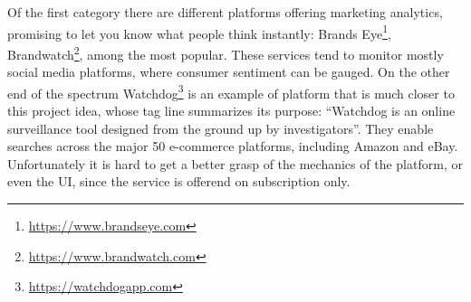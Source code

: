 Of the first category there are different platforms offering marketing
analytics, promising to let you know what people think instantly: Brands
Eye\texttrademark\footnote{\url{https://www.brandseye.com}},
Brandwatch\texttrademark\footnote{\url{https://www.brandwatch.com}}, among the
most popular. These services tend to monitor mostly social media platforms,
where consumer sentiment can be gauged. On the other end of the spectrum
Watchdog\texttrademark\footnote{\url{https://watchdogapp.com}} is an example
of platform that is much closer to this project idea, whose tag line summarizes
its purpose: ``Watchdog is an online surveillance tool
designed from the ground up by investigators''\cite{wtchd}. They enable searches
across the major 50 e-commerce platforms, including Amazon and eBay.
Unfortunately it is hard to get a better grasp of the mechanics of the platform,
or even the UI, since the service is offerend on subscription only.

